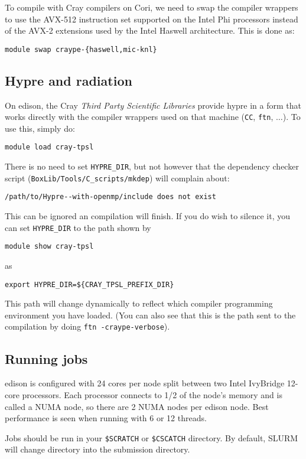 To compile with Cray compilers on Cori, we need to swap the compiler
wrappers to use the AVX-512 instruction set supported on the Intel Phi
processors instead of the AVX-2 extensions used by the Intel Haswell
architecture.  This is done as:
\begin{verbatim}
module swap craype-{haswell,mic-knl}
\end{verbatim}


\subsection{Hypre and radiation}

On edison, the Cray {\em Third Party Scientific Libraries} provide
{\sf hypre} in a form that works directly with the compiler wrappers
used on that machine ({\tt CC}, {\tt ftn}, $\ldots$).  To use this,
simply do:
\begin{verbatim}
module load cray-tpsl
\end{verbatim}
There is no need to set {\tt HYPRE\_DIR}, but not however that the 
dependency checker script ({\tt BoxLib/Tools/C\_scripts/mkdep}) will
complain about:
\begin{verbatim}
/path/to/Hypre--with-openmp/include does not exist
\end{verbatim}
This can be ignored an compilation will finish.  If you do wish to 
silence it, you can set {\tt HYPRE\_DIR} to the path shown by
\begin{verbatim}
module show cray-tpsl
\end{verbatim}
as
\begin{verbatim}
export HYPRE_DIR=${CRAY_TPSL_PREFIX_DIR}
\end{verbatim}
This path will change dynamically to reflect which compiler programming
environment you have loaded.  (You can also see that this is the path
sent to the compilation by doing {\tt ftn -craype-verbose}).


\subsection{Running jobs}

edison is configured with 24 cores per node split between two Intel             
IvyBridge 12-core processors.  Each processor connects to 1/2 of the            
node's memory and is called a NUMA node, so there are 2 NUMA nodes per          
edison node.  Best performance is seen when running with 6 or 12 threads.  

Jobs should be run in your {\tt \$SCRATCH} or {\tt \$CSCATCH} directory.
By default, SLURM will change directory into the submission directory.

